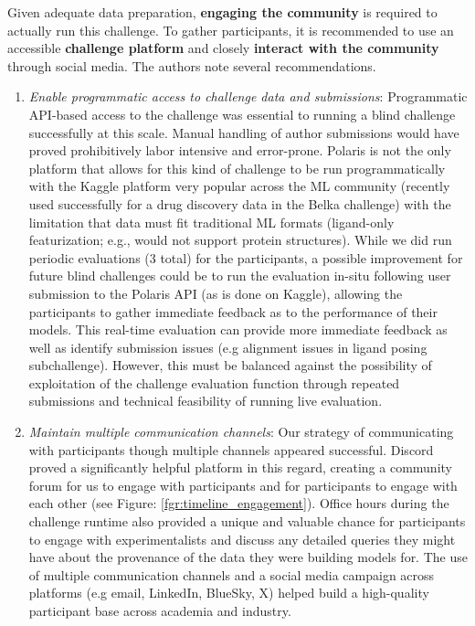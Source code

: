 \documentclass[journal=jcim,manuscript=article]{achemso}
\begin{document}
Given adequate data preparation, \textbf{engaging the community} is required to actually run this challenge. To gather participants, it is recommended to use an accessible \textbf{challenge platform} and closely \textbf{interact with the community} through social media. The authors note several recommendations.
\begin{enumerate}
    \item \textit{Enable programmatic access to challenge data and submissions}: Programmatic API-based access to the challenge was essential to running a blind challenge successfully at this scale. Manual handling of author submissions would have proved prohibitively labor intensive and error-prone. Polaris is not the only platform that allows for this kind of challenge to be run programmatically with the  Kaggle platform very popular across the ML community (recently used successfully for a drug discovery data in the Belka challenge\cite{quigley2024belka}) with the limitation that data must fit traditional ML formats (ligand-only featurization; e.g., would not support protein structures). While we did run periodic evaluations (3 total) for the participants, a possible improvement for future blind challenges could be to run the evaluation in-situ following user submission to the Polaris API (as is done on Kaggle), allowing the participants to gather immediate feedback as to the performance of their models. This real-time evaluation can provide more immediate feedback as well as identify submission issues (e.g alignment issues in ligand posing subchallenge). However, this must be balanced against the possibility of exploitation of the challenge evaluation function through repeated submissions and technical feasibility of running live evaluation.
    \item \textit{Maintain multiple communication channels}: Our strategy of communicating with participants though multiple channels appeared successful. Discord proved a significantly helpful platform in this regard, creating a community forum for us to engage with participants and for participants to engage with each other (see Figure: \ref{fgr:timeline_engagement}). Office hours during the challenge runtime also provided a unique and valuable chance for participants to engage with experimentalists and discuss any detailed queries they might have about the provenance of the data they were building models for. The use of multiple communication channels and a social media campaign across platforms (e.g email, LinkedIn, BlueSky, X) helped build a high-quality participant base across academia and industry.
    

\end{enumerate}
\end{document}
